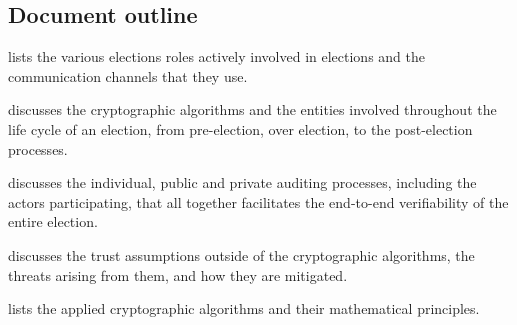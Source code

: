 \subsection{Document outline}
 lists the various elections roles actively involved in elections and the communication channels that they use.

 discusses the cryptographic algorithms and the entities involved throughout the life cycle of an election, from pre-election, over election, to the post-election processes.

 discusses the individual, public and private auditing processes, including the actors participating, that all together facilitates the  end-to-end verifiability of the entire election.

 discusses the trust assumptions outside of the cryptographic algorithms, the threats arising from them, and how they are mitigated.

 lists the applied cryptographic algorithms and their mathematical principles.
